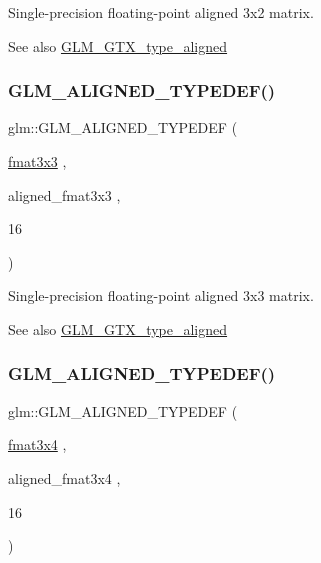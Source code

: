 Single-\/precision floating-\/point aligned 3x2 matrix. \begin{DoxySeeAlso}{See also}
\mbox{\hyperlink{group__gtx__type__aligned}{G\+L\+M\+\_\+\+G\+T\+X\+\_\+type\+\_\+aligned}} 
\end{DoxySeeAlso}
\mbox{\label{group__gtx__type__aligned_ga27b13f465abc8a40705698145e222c3f}} 
\subsubsection{\texorpdfstring{GLM\_ALIGNED\_TYPEDEF()}{GLM\_ALIGNED\_TYPEDEF()}\hspace{0.1cm}{\footnotesize\ttfamily [176/209]}}
{\footnotesize\ttfamily glm\+::\+G\+L\+M\+\_\+\+A\+L\+I\+G\+N\+E\+D\+\_\+\+T\+Y\+P\+E\+D\+EF (\begin{DoxyParamCaption}\item[{\mbox{\hyperlink{group__gtc__type__precision_ga577209f19554f5291cc3d66dda9a4388}{fmat3x3}}}]{,  }\item[{aligned\+\_\+fmat3x3}]{,  }\item[{16}]{ }\end{DoxyParamCaption})}

Single-\/precision floating-\/point aligned 3x3 matrix. \begin{DoxySeeAlso}{See also}
\mbox{\hyperlink{group__gtx__type__aligned}{G\+L\+M\+\_\+\+G\+T\+X\+\_\+type\+\_\+aligned}} 
\end{DoxySeeAlso}
\mbox{\label{group__gtx__type__aligned_ga2608d19cc275830a6f8c0b6405625a4f}} 
\subsubsection{\texorpdfstring{GLM\_ALIGNED\_TYPEDEF()}{GLM\_ALIGNED\_TYPEDEF()}\hspace{0.1cm}{\footnotesize\ttfamily [177/209]}}
{\footnotesize\ttfamily glm\+::\+G\+L\+M\+\_\+\+A\+L\+I\+G\+N\+E\+D\+\_\+\+T\+Y\+P\+E\+D\+EF (\begin{DoxyParamCaption}\item[{\mbox{\hyperlink{group__gtc__type__precision_gad68d9daa91ef05b29e80e044931837cf}{fmat3x4}}}]{,  }\item[{aligned\+\_\+fmat3x4}]{,  }\item[{16}]{ }\end{DoxyParamCaption})}

